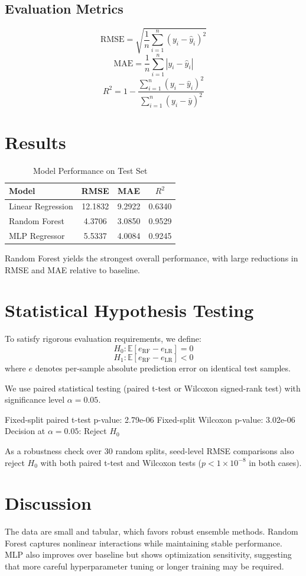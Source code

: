 \documentclass[conference]{IEEEtran}
\begin{document}
\subsection{Evaluation Metrics}
\[
\mathrm{RMSE} = \sqrt{\frac{1}{n}\sum_{i=1}^{n}(y_i-\hat{y}_i)^2}
\]
\[
\mathrm{MAE} = \frac{1}{n}\sum_{i=1}^{n}|y_i-\hat{y}_i|
\]
\[
R^2 = 1 - \frac{\sum_{i=1}^{n}(y_i-\hat{y}_i)^2}{\sum_{i=1}^{n}(y_i-\bar{y})^2}
\]

\section{Results}
\begin{table}[htbp]
\caption{Model Performance on Test Set}
\centering
\begin{tabular}{lccc}
\toprule
Model & RMSE & MAE & $R^2$ \\
\midrule
Linear Regression & 12.1832 & 9.2922 & 0.6340 \\
Random Forest & 4.3706 & 3.0850 & 0.9529 \\
MLP Regressor & 5.5337 & 4.0084 & 0.9245 \\
\bottomrule
\end{tabular}
\end{table}

Random Forest yields the strongest overall performance, with large reductions in RMSE and MAE relative to baseline.

\section{Statistical Hypothesis Testing}
To satisfy rigorous evaluation requirements, we define:
\[
H_0: \mathbb{E}[e_{\mathrm{RF}} - e_{\mathrm{LR}}] = 0
\]
\[
H_1: \mathbb{E}[e_{\mathrm{RF}} - e_{\mathrm{LR}}] < 0
\]
where $e$ denotes per-sample absolute prediction error on identical test samples.

We use paired statistical testing (paired t-test or Wilcoxon signed-rank test) with significance level $\alpha=0.05$.

Fixed-split paired t-test p-value: 2.79e-06\newline
Fixed-split Wilcoxon p-value: 3.02e-06\newline
Decision at $\alpha=0.05$: Reject $H_0$

As a robustness check over 30 random splits, seed-level RMSE comparisons also reject $H_0$ with both paired t-test and Wilcoxon tests ($p<1\times10^{-8}$ in both cases).

\section{Discussion}
The data are small and tabular, which favors robust ensemble methods. Random Forest captures nonlinear interactions while maintaining stable performance. MLP also improves over baseline but shows optimization sensitivity, suggesting that more careful hyperparameter tuning or longer training may be required.
\end{document}
